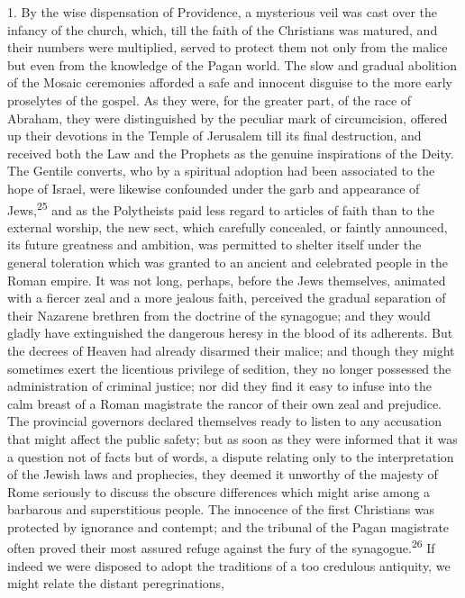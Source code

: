 1. By the wise dispensation of Providence, a mysterious veil was
cast over the infancy of the church, which, till the faith of the
Christians was matured, and their numbers were multiplied, served
to protect them not only from the malice but even from the
knowledge of the Pagan world. The slow and gradual abolition of
the Mosaic ceremonies afforded a safe and innocent disguise to
the more early proselytes of the gospel. As they were, for the
greater part, of the race of Abraham, they were distinguished by
the peculiar mark of circumcision, offered up their devotions in
the Temple of Jerusalem till its final destruction, and received
both the Law and the Prophets as the genuine inspirations of the
Deity. The Gentile converts, who by a spiritual adoption had been
associated to the hope of Israel, were likewise confounded under
the garb and appearance of Jews,\textsuperscript{25} and as the Polytheists paid
less regard to articles of faith than to the external worship,
the new sect, which carefully concealed, or faintly announced,
its future greatness and ambition, was permitted to shelter
itself under the general toleration which was granted to an
ancient and celebrated people in the Roman empire. It was not
long, perhaps, before the Jews themselves, animated with a
fiercer zeal and a more jealous faith, perceived the gradual
separation of their Nazarene brethren from the doctrine of the
synagogue; and they would gladly have extinguished the dangerous
heresy in the blood of its adherents. But the decrees of Heaven
had already disarmed their malice; and though they might
sometimes exert the licentious privilege of sedition, they no
longer possessed the administration of criminal justice; nor did
they find it easy to infuse into the calm breast of a Roman
magistrate the rancor of their own zeal and prejudice. The
provincial governors declared themselves ready to listen to any
accusation that might affect the public safety; but as soon as
they were informed that it was a question not of facts but of
words, a dispute relating only to the interpretation of the
Jewish laws and prophecies, they deemed it unworthy of the
majesty of Rome seriously to discuss the obscure differences
which might arise among a barbarous and superstitious people. The
innocence of the first Christians was protected by ignorance and
contempt; and the tribunal of the Pagan magistrate often proved
their most assured refuge against the fury of the synagogue.\textsuperscript{26}
If indeed we were disposed to adopt the traditions of a too
credulous antiquity, we might relate the distant peregrinations,
